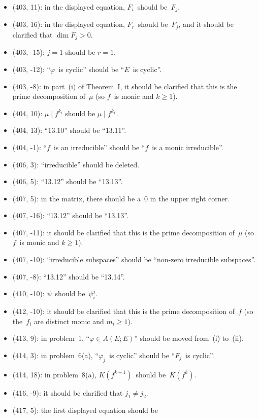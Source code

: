 \documentclass[letterpaper,12pt]{article}
\newcommand{\divides}{\mid}
\begin{document}
\begin{itemize}
\item (403, 11): in the displayed equation, \(F_i\)~should be~\(F_j\).
\item (403, 16): in the displayed equation, \(F_r\)~should be~\(F_j\), and it should be clarified that \(\dim F_j>0\).
\item (403, -15): \(j=1\) should be \(r=1\).
\item (403, -12): ``\(\varphi\)~is cyclic'' should be ``\(E\)~is cyclic''.
\item (403, -8): in part~(i) of Theorem~I, it should be clarified that this is the prime decomposition of~\(\mu\) (so \(f\)~is monic and \(k\ge 1\)).
\item (404, 10): \(\mu\divides f^{k_i}\) should be \(\mu\divides f^{k_1}\).
\item (404, 13): ``13.10'' should be ``13.11''.
\item (404, -1): ``\(f\)~is an irreducible'' should be ``\(f\)~is a monic irreducible''.
\item (406, 3): ``irreducible'' should be deleted.
\item (406, 5): ``13.12'' should be ``13.13''.
\item (407, 5): in the matrix, there should be a~\(0\) in the upper right corner.
\item (407, -16): ``13.12'' should be ``13.13''.
\item (407, -11): it should be clarified that this is the prime decomposition of~\(\mu\) (so \(f\)~is monic and \(k\ge 1\)).
\item (407, -10): ``irreducible subspaces'' should be ``non-zero irreducible subspaces''.
\item (407, -8): ``13.12'' should be ``13.14''.
\item (410, -10): \(\psi\)~should be~\(\psi_i^j\).
\item (412, -10): it should be clarified that this is the prime decomposition of~\(f\) (so the~\(f_i\) are distinct monic and \(m_i\ge 1\)).
\item (413, 9): in problem~1, ``\(\varphi\in A(E;E)\)'' should be moved from~(i) to~(ii).
\item (414, 3): in problem~6(a), ``\(\varphi_j\)~is cyclic'' should be ``\(F_j\)~is cyclic''.
\item (414, 18): in problem~8(a), \(K(f^{k-1})\)~should be~\(K(f^k)\).
\item (416, -9): it should be clarified that \(j_1\ne j_2\).
\item (417, 5): the first displayed equation should be

\end{itemize}
\end{document}
